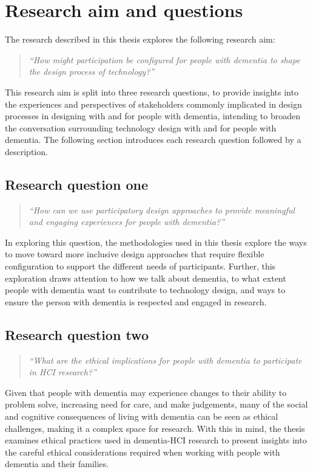 \section{Research aim and questions}
\label{Intro:RQ}
The research described in this thesis explores the following research aim:
\begin{quote}
    \textit{``How might participation be configured for people with dementia to shape the design process of technology?''}
\end{quote}
This research aim is split into three research questions, to provide insights into the experiences and perspectives of stakeholders commonly implicated in design processes in designing with and for people with dementia, intending to broaden the conversation surrounding technology design with and for people with dementia. The following section introduces each research question followed by a description.

\subsection{Research question one}
\label{RQ1}
\begin{quote}
\textit{``How can we use participatory design approaches to provide meaningful and engaging experiences for people with dementia?''}
\end{quote}
In exploring this question, the methodologies used in this thesis explore the ways to move toward more inclusive design approaches that require flexible configuration to support the different needs of participants. Further, this exploration draws attention to how we talk about dementia, to what extent people with dementia want to contribute to technology design, and ways to ensure the person with dementia is respected and engaged in research.

\subsection{Research question two}
\label{RQ2}
\begin{quote}
\textit{``What are the ethical implications for people with dementia to participate in HCI research?''}
\end{quote}
Given that people with dementia may experience changes to their ability to problem solve, increasing need for care, and make judgements, many of the social and cognitive consequences of living with dementia can be seen as ethical challenges, making it a complex space for research. With this in mind, the thesis examines ethical practices used in dementia-HCI research to present insights into the careful ethical considerations required when working with people with dementia and their families. 

